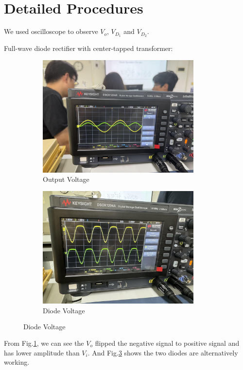 \section{Detailed Procedures}
We used oscilloscope to observe $V_o$, $V_{D_1}$ and $V_{D_2}$.\par
Full-wave diode rectifier with center-tapped  transformer:\par
    \begin{figure}[h]
        \centering
        \begin{subfigure}[h]{0.45\textwidth}
            \centering
            \includegraphics[width=0.9\textwidth]{Lab03/Images/3.4_outPutVoltage.jpg}
            \caption{Output Voltage}
            \label{L3.4OV}
        \end{subfigure}
        \hfill
        \begin{subfigure}[h]{0.45\textwidth}
            \centering
            \includegraphics[width=0.9\textwidth]{Lab03/Images/3.4_diodeVoltage.jpg}
            \caption{Diode Voltage}
            \label{L3.4DV}
        \end{subfigure}
    \end{figure}
    \FloatBarrier
From Fig.\ref{L3.4OV}, we can see the $V_o$ flipped the negative signal to positive signal and has lower amplitude than $V_i$. And Fig.\ref{L3.4DV} shows the two diodes are alternatively working.

